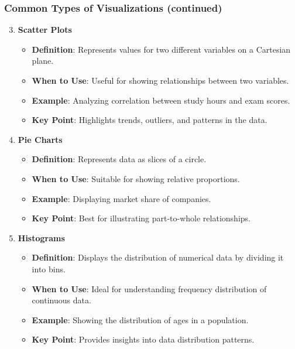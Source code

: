 \documentclass[aspectratio=169]{beamer}
\begin{document}
\begin{frame}[fragile]
    \frametitle{Common Types of Visualizations (continued)}
    \begin{enumerate}
        \setcounter{enumi}{2} %
        \item \textbf{Scatter Plots}
            \begin{itemize}
                \item \textbf{Definition}: Represents values for two different variables on a Cartesian plane.
                \item \textbf{When to Use}: Useful for showing relationships between two variables.
                \item \textbf{Example}: Analyzing correlation between study hours and exam scores.
                \item \textbf{Key Point}: Highlights trends, outliers, and patterns in the data.
            \end{itemize}
        \item \textbf{Pie Charts}
            \begin{itemize}
                \item \textbf{Definition}: Represents data as slices of a circle.
                \item \textbf{When to Use}: Suitable for showing relative proportions.
                \item \textbf{Example}: Displaying market share of companies.
                \item \textbf{Key Point}: Best for illustrating part-to-whole relationships.
            \end{itemize}
        \item \textbf{Histograms}
            \begin{itemize}
                \item \textbf{Definition}: Displays the distribution of numerical data by dividing it into bins.
                \item \textbf{When to Use}: Ideal for understanding frequency distribution of continuous data.
                \item \textbf{Example}: Showing the distribution of ages in a population.
                \item \textbf{Key Point}: Provides insights into data distribution patterns.
            \end{itemize}
    \end{enumerate}
\end{frame}
\end{document}
